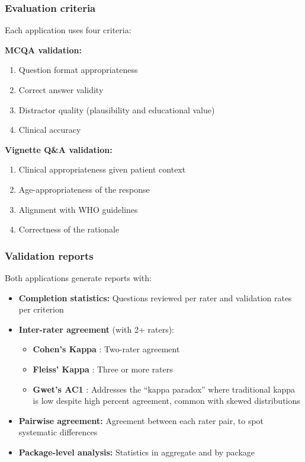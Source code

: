 \subsubsection{Evaluation criteria}
Each application uses four criteria:

\textbf{MCQA validation:}
\begin{enumerate}
    \item Question format appropriateness
    \item Correct answer validity
    \item Distractor quality (plausibility and educational value)
    \item Clinical accuracy
\end{enumerate}

\textbf{Vignette Q\&A validation:}
\begin{enumerate}
    \item Clinical appropriateness given patient context
    \item Age-appropriateness of the response
    \item Alignment with WHO guidelines
    \item Correctness of the rationale
\end{enumerate}

\subsubsection{Validation reports}
Both applications generate reports with:

\begin{itemize}
    \item \textbf{Completion statistics:} Questions reviewed per rater and validation rates per criterion
    \item \textbf{Inter-rater agreement} (with 2+ raters):
    \begin{itemize}
        \item \textbf{Cohen's Kappa} \cite{cohen1960}: Two-rater agreement
        \item \textbf{Fleiss' Kappa} \cite{fleiss1971}: Three or more raters
        \item \textbf{Gwet's AC1} \cite{gwet2008}: Addresses the ``kappa paradox'' where traditional kappa is low despite high percent agreement, common with skewed distributions
    \end{itemize}
    \item \textbf{Pairwise agreement:} Agreement between each rater pair, to spot systematic differences
    \item \textbf{Package-level analysis:} Statistics in aggregate and by package
\end{itemize}


